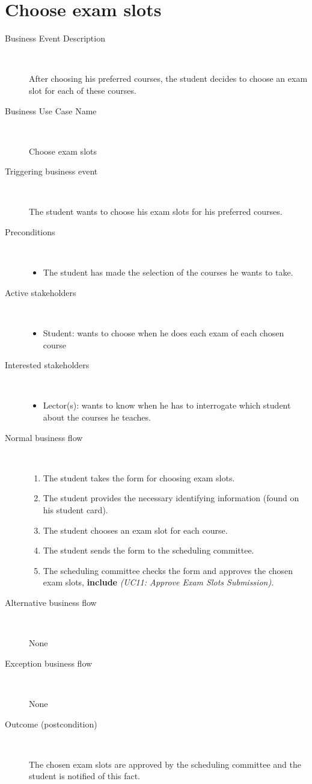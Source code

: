 \section{Choose exam slots}

\begin{description}
	\item[Business Event Description] \ 
		\par After choosing his preferred courses, the student decides to choose an
		exam slot for each of these courses.
	\item[Business Use Case Name] \ 
		\par Choose exam slots
	\item[Triggering business event] \ 
		\par The student wants to choose his exam slots for his preferred courses.
	\item[Preconditions] \
	\begin{itemize}
		\item The student has made the selection of the courses he wants to take.
	\end{itemize}
	\item[Active stakeholders] \ 
	\begin{itemize}
		\item Student: wants to choose when he does each exam of each chosen course
	\end{itemize}
	\item[Interested stakeholders] \ 
		\begin{itemize}
		\item Lector(s): wants to know when he has to interrogate which student about
		the courses he teaches.
		\end{itemize}
	\item[Normal business flow] \ 
	\begin{enumerate}
	  	\item The student takes the form for choosing exam slots.
	  	\item The student provides the necessary identifying information (found on
	  	his student card).
	  	\item The student chooses an exam slot for each course.
	  	\item The student sends the form to the scheduling committee.
	  	\item The scheduling committee checks the form and approves the chosen exam
	  	slots, \textbf{include} \emph{(UC11: Approve Exam Slots Submission)}.
	\end{enumerate}
	\item[Alternative business flow] \
		\par None 
	\item[Exception business flow] \ 
		\par None
	\item[Outcome (postcondition)] \ 
		\par The chosen exam slots are approved by the scheduling committee and the
		student is notified of this fact.
\end{description}